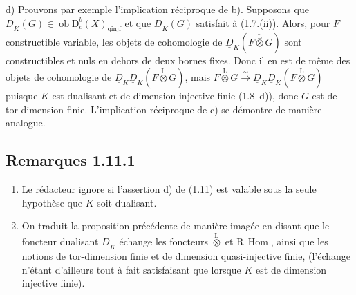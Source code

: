 \documentclass[11pt]{article}
\DeclareMathOperator{\Hom}{Hom}
\newcommand{\R}{\mathrm{R}}\newcommand{\RHomCore}{\mathrm{RHom}}
\newcommand{\D}{\mathrm{D}}
\newcommand{\ob}{\operatorname{ob}}
\providecommand{\Hom}{\operatorname{Hom}}
\providecommand{\ob}{\operatorname{ob}}
\providecommand{\R}{\mathrm R}
\providecommand{\Hom}{\operatorname{Hom}}
\begin{document}
d)
Prouvons par exemple l'implication réciproque de b). Supposons que $\underline{D}_K(G) \in \ob \D_c^{b}(X)_{\mathrm{qinjf}}$ et que $\underline{D}_K(G)$ satisfait à (1.7.(ii)). Alors, pour $F$ constructible variable, les objets de cohomologie de $\underline{D}_K(F \mathop{\otimes}\limits^{\mathrm{L}} G)$ sont constructibles et nuls en dehors de deux bornes fixes. Donc il en est de même des objets de cohomologie de $\underline{D}_K \underline{D}_K(F \mathop{\otimes}\limits^{\mathrm{L}} G)$, mais $F \mathop{\otimes}\limits^{\mathrm{L}} G \xrightarrow{\sim} \underline{D}_K \underline{D}_K(F \mathop{\otimes}\limits^{\mathrm{L}} G)$ puisque $K$ est dualisant et de dimension injective finie (1.8~d)), donc $G$ est de tor-dimension finie. L'implication réciproque de c) se démontre de manière analogue.

\subsection*{Remarques 1.11.1}
\begin{enumerate}
\item[a)] Le rédacteur ignore si l'assertion d) de (1.11) est valable sous la seule hypothèse que $K$ soit dualisant.
\item[b)] On traduit la proposition précédente de manière imagée en disant que le foncteur dualisant $\underline{D}_K$ échange les foncteurs $\mathop{\otimes}\limits^{\mathrm{L}}$ et $\R\,\underline{\Hom}$, ainsi que les notions de tor-dimension finie et de dimension quasi-injective finie, (l'échange n'étant d'ailleurs tout à fait satisfaisant que lorsque $K$ est de dimension injective finie).
\end{enumerate}
\end{document}
